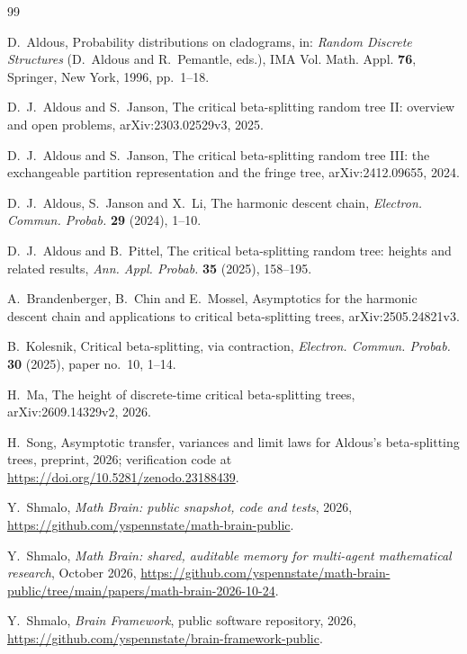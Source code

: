 \documentclass[11pt]{amsart}
\theoremstyle{remark}
\numberwithin{equation}{section}
\begin{document}
\begin{thebibliography}{99}

D.~Aldous,
Probability distributions on cladograms,
in: \emph{Random Discrete Structures} (D.~Aldous and R.~Pemantle, eds.),
IMA Vol. Math. Appl. \textbf{76}, Springer, New York, 1996, pp.~1--18.

D.~J.~Aldous and S.~Janson,
The critical beta-splitting random tree II: overview and open problems,
arXiv:2303.02529v3, 2025.

D.~J.~Aldous and S.~Janson,
The critical beta-splitting random tree III: the exchangeable partition representation and the fringe tree,
arXiv:2412.09655, 2024.

D.~J.~Aldous, S.~Janson and X.~Li,
The harmonic descent chain,
\emph{Electron. Commun. Probab.} \textbf{29} (2024), 1--10.

D.~J.~Aldous and B.~Pittel,
The critical beta-splitting random tree: heights and related results,
\emph{Ann. Appl. Probab.} \textbf{35} (2025), 158--195.

A.~Brandenberger, B.~Chin and E.~Mossel,
Asymptotics for the harmonic descent chain and applications to critical beta-splitting trees,
arXiv:2505.24821v3.

B.~Kolesnik,
Critical beta-splitting, via contraction,
\emph{Electron. Commun. Probab.} \textbf{30} (2025), paper no.~10, 1--14.

H.~Ma,
The height of discrete-time critical beta-splitting trees,
arXiv:2609.14329v2, 2026.

H.~Song,
Asymptotic transfer, variances and limit laws for Aldous's beta-splitting trees,
preprint, 2026; verification code at \url{https://doi.org/10.5281/zenodo.23188439}.

 Y.~Shmalo, \emph{Math Brain: public snapshot, code and tests}, 2026, \url{https://github.com/yspennstate/math-brain-public}.

 Y.~Shmalo, \emph{Math Brain: shared, auditable memory for multi-agent mathematical research}, October 2026, \url{https://github.com/yspennstate/math-brain-public/tree/main/papers/math-brain-2026-10-24}.

 Y.~Shmalo, \emph{Brain Framework}, public software repository, 2026, \url{https://github.com/yspennstate/brain-framework-public}.

\end{thebibliography}
\end{document}
